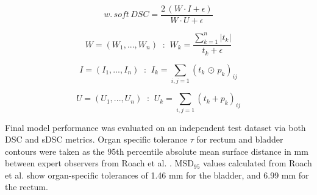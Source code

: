 \begin{equation}
w. \, soft \, DSC = \frac{2 \, (W \cdot I + \epsilon)}{W \cdot U + \epsilon}
\label{eq:method_wsdsc}
\end{equation}


\begin{equation}
W = (W_{1}, ..., W_{n}) \; \; \textbf{:} \; \; W_{k} = \frac{\sum_{k=1}^{n} |t_{k} |}{t_{k} + \epsilon}
\label{eq:w}
\end{equation}

\begin{equation}
I = (I_{1}, ..., I_{n}) \; \; \textbf{:} \; \; I_{k} = \sum_{i,j=1}(t_{k} \, \odot \,  p_{k})_{ij}
\label{eq:i}
\end{equation}

\begin{equation}
U = (U_{1}, ..., U_{n}) \; \; \textbf{:} \; \; U_{k} =  \sum_{i,j=1}(t_{k} + p_{k})_{ij}
\label{eq:u}
\end{equation}


Final model performance was evaluated on an independent test dataset via both DSC and sDSC metrics. Organ specific tolerance $\tau$ for rectum and bladder contours were taken as the 95th percentile absolute mean surface distance in mm between expert observers from Roach et al. \cite{Roach_2019}. MSD$_{95}$ values calculated from Roach et al. show organ-specific tolerances of 1.46 mm for the bladder, and 6.99 mm for the rectum.
